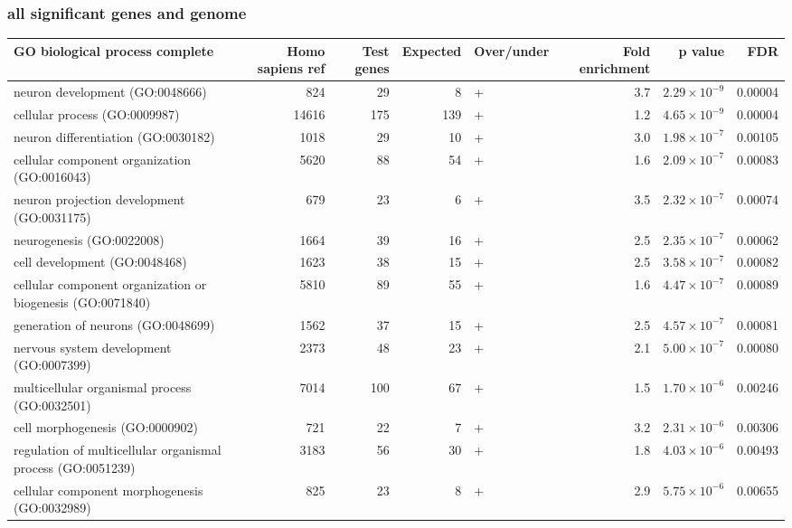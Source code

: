 \subsubsection{all significant genes and genome}
\begin{table}[ht]
\centering
\begin{adjustbox}{width=\textwidth}
\begin{tabular}{lrrrlrrr}
  \hline
GO biological process complete & Homo sapiens ref & Test genes & Expected & Over/under & Fold enrichment & p value & FDR \\ 
  \hline
neuron development (GO:0048666) & 824 & 29 & 8 & + & 3.7 & $2.29 \times 10^{-9}$ & 0.00004 \\ 
  cellular process (GO:0009987) & 14616 & 175 & 139 & + & 1.2 & $4.65 \times 10^{-9}$ & 0.00004 \\ 
  neuron differentiation (GO:0030182) & 1018 & 29 & 10 & + & 3.0 & $1.98 \times 10^{-7}$ & 0.00105 \\ 
  cellular component organization (GO:0016043) & 5620 & 88 & 54 & + & 1.6 & $2.09 \times 10^{-7}$ & 0.00083 \\ 
  neuron projection development (GO:0031175) & 679 & 23 & 6 & + & 3.5 & $2.32 \times 10^{-7}$ & 0.00074 \\ 
  neurogenesis (GO:0022008) & 1664 & 39 & 16 & + & 2.5 & $2.35 \times 10^{-7}$ & 0.00062 \\ 
  cell development (GO:0048468) & 1623 & 38 & 15 & + & 2.5 & $3.58 \times 10^{-7}$ & 0.00082 \\ 
  cellular component organization or biogenesis (GO:0071840) & 5810 & 89 & 55 & + & 1.6 & $4.47 \times 10^{-7}$ & 0.00089 \\ 
  generation of neurons (GO:0048699) & 1562 & 37 & 15 & + & 2.5 & $4.57 \times 10^{-7}$ & 0.00081 \\ 
  nervous system development (GO:0007399) & 2373 & 48 & 23 & + & 2.1 & $5.00 \times 10^{-7}$ & 0.00080 \\ 
  multicellular organismal process (GO:0032501) & 7014 & 100 & 67 & + & 1.5 & $1.70 \times 10^{-6}$ & 0.00246 \\ 
  cell morphogenesis (GO:0000902) & 721 & 22 & 7 & + & 3.2 & $2.31 \times 10^{-6}$ & 0.00306 \\ 
  regulation of multicellular organismal process (GO:0051239) & 3183 & 56 & 30 & + & 1.8 & $4.03 \times 10^{-6}$ & 0.00493 \\ 
  cellular component morphogenesis (GO:0032989) & 825 & 23 & 8 & + & 2.9 & $5.75 \times 10^{-6}$ & 0.00655 \\ 

\end{tabular}
\end{adjustbox}
\end{table}
